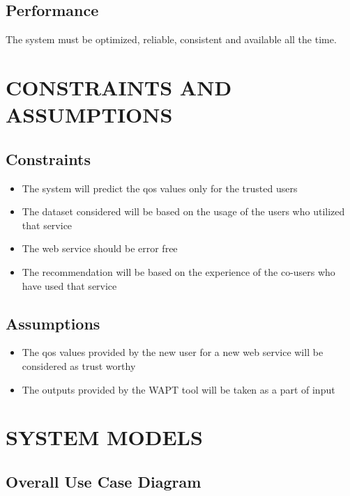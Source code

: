 \subsection{Performance}
  The system must be optimized, reliable, consistent and available
  all the time.
\section{CONSTRAINTS AND ASSUMPTIONS}
\subsection{Constraints}
\begin{itemize}
    \item The system will predict the qos values only for the trusted users
    \item The dataset considered will be based on the usage of the users who utilized that service
    \item The web service should be error free
    \item The recommendation will be based on the experience of the co-users who have used that service
    
\end{itemize}
\subsection{Assumptions}
\begin{itemize}
    \item The qos values provided by the new user for a new web service will be considered as trust worthy 
    \item The outputs provided by the WAPT tool will be taken as a part of input
\end{itemize}
\bigskip
\bigskip
\section{SYSTEM MODELS}
\subsection{Overall Use Case Diagram}

